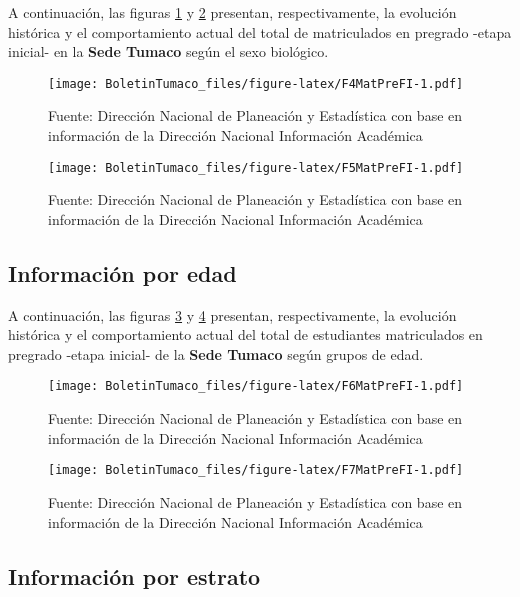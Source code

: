 \documentclass[
]{book}
\begin{document}
A continuación, las figuras \ref{fig:F4MatPreFI} y \ref{fig:F5MatPreFI} presentan, respectivamente, la evolución histórica y el comportamiento actual del total de matriculados en pregrado -etapa inicial- en la \textbf{Sede Tumaco} según el sexo biológico.

\begin{figure}
\centering
\texttt{[image: BoletinTumaco\_files/figure-latex/F4MatPreFI-1.pdf]}
\caption{\label{fig:F4MatPreFI}Fuente: Dirección Nacional de Planeación y Estadística con base en información de la Dirección Nacional Información Académica}
\end{figure}

\begin{figure}
\centering
\texttt{[image: BoletinTumaco\_files/figure-latex/F5MatPreFI-1.pdf]}
\caption{\label{fig:F5MatPreFI}Fuente: Dirección Nacional de Planeación y Estadística con base en información de la Dirección Nacional Información Académica}
\end{figure}

\hypertarget{informaciuxf3n-por-edad-3}{%
\subsection{Información por edad}\label{informaciuxf3n-por-edad-3}}

A continuación, las figuras \ref{fig:F6MatPreFI} y \ref{fig:F7MatPreFI} presentan, respectivamente, la evolución histórica y el comportamiento actual del total de estudiantes matriculados en pregrado -etapa inicial- de la \textbf{Sede Tumaco} según grupos de edad.

\begin{figure}
\centering
\texttt{[image: BoletinTumaco\_files/figure-latex/F6MatPreFI-1.pdf]}
\caption{\label{fig:F6MatPreFI}Fuente: Dirección Nacional de Planeación y Estadística con base en información de la Dirección Nacional Información Académica}
\end{figure}

\begin{figure}
\centering
\texttt{[image: BoletinTumaco\_files/figure-latex/F7MatPreFI-1.pdf]}
\caption{\label{fig:F7MatPreFI}Fuente: Dirección Nacional de Planeación y Estadística con base en información de la Dirección Nacional Información Académica}
\end{figure}

\hypertarget{informaciuxf3n-por-estrato-1}{%
\subsection{Información por estrato}\label{informaciuxf3n-por-estrato-1}}
\end{document}
